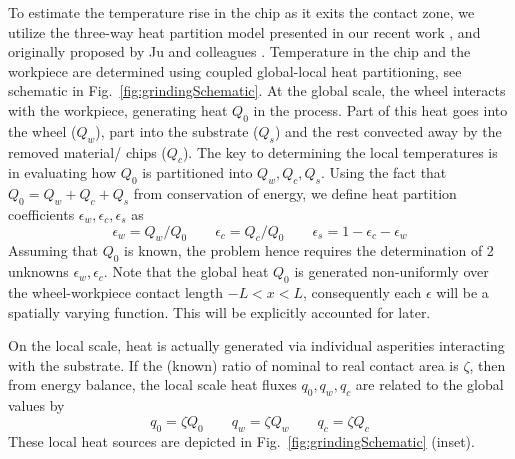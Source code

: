 \documentclass[11pt]{article}
\begin{document}
To estimate the temperature rise in the chip as it exits the contact zone, we utilize the three-way heat partition model presented in our recent work \cite{DhamiJOM}, and originally proposed by Ju and colleagues \cite{ju1998theoretical}. Temperature in the chip and the workpiece are determined using coupled global-local heat partitioning, see schematic in Fig.~\ref{fig:grindingSchematic}. At the global scale, the wheel interacts with the workpiece, generating heat $Q_0$ in the process. Part of this heat goes into the wheel ($Q_w$), part into the substrate ($Q_s$) and the rest convected away by the removed material/ chips ($Q_c$). The key to determining the local temperatures is in evaluating how $Q_0$ is partitioned into $Q_w, Q_c, Q_s$. Using the fact that $Q_0 = Q_w + Q_c + Q_s$ from conservation of energy, we define heat partition coefficients $\epsilon_w, \epsilon_c, \epsilon_s$ as
\begin{equation}
  \label{eqn:partitionCoeff}
  \epsilon_w = Q_w/Q_0 \quad\quad \epsilon_c = Q_c/Q_0 \quad\quad \epsilon_s = 1 - \epsilon_c - \epsilon_w
\end{equation}
Assuming that $Q_0$ is known, the problem hence requires the determination of 2 unknowns $\epsilon_w, \epsilon_c$. Note that the global heat $Q_0$ is generated non-uniformly over the wheel-workpiece contact length $-L < x < L$, consequently each $\epsilon$ will be a spatially varying function. This will be explicitly accounted for later.

On the local scale, heat is actually generated via individual asperities interacting with the substrate. If the (known) ratio of nominal to real contact area is $\zeta$, then from energy balance, the local scale heat fluxes $q_0, q_w, q_c$ are related to the global values by
\begin{equation}
  \label{eqn:local_heats}
  q_0 = \zeta Q_0 \quad\quad q_w = \zeta Q_w \quad\quad q_c = \zeta Q_c
\end{equation}
These local heat sources are depicted in Fig.~\ref{fig:grindingSchematic} (inset). 
\end{document}
